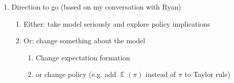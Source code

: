 \documentclass[11pt]{article}
\renewcommand{\[}{\begin{equation}}
\renewcommand{\]}{\end{equation}}
\DeclareMathOperator{\E}{\mathbb{E}}
\begin{document}
\begin{enumerate}
\begin{enumerate}
\end{enumerate}
\item Direction to go (based on my conversation with Ryan)
\begin{enumerate}
\item Either: take model seriously and explore policy implications
\item Or: change something about the model
\begin{enumerate}
\item Change expectation formation
\item or change policy (e.g. add $\E(\pi)$ instead of $\pi$ to Taylor rule)
\end{enumerate}

\end{enumerate}
\end{enumerate}
\end{document}
